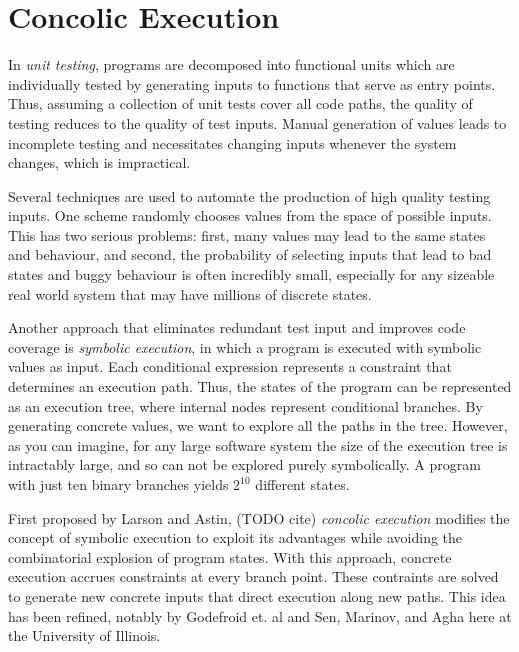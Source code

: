 \section{Concolic Execution}
In \textit{unit testing}, programs are decomposed into functional units which
are individually tested by generating inputs to functions that serve as entry
points. Thus, assuming a collection of unit tests cover all code paths, the
quality of testing reduces to the quality of test inputs. Manual generation of
values leads to incomplete testing and necessitates changing inputs whenever the
system changes, which is impractical. \par
Several techniques are used to automate
the production of high quality testing inputs. One scheme randomly chooses
values from the space of possible inputs. This has two serious problems: first,
many values may lead to the same states and behaviour, and second, the
probability of selecting inputs that lead to bad states and buggy behaviour is
often incredibly small, especially for any sizeable real world system that may
have millions of discrete states. \par
Another approach that eliminates redundant
test input and improves code coverage is \textit{symbolic execution}, in which a
program is executed with symbolic values as input. Each conditional expression
represents a constraint that determines an execution path. Thus, the states of
the program can be represented as an execution tree, where internal nodes
represent conditional branches. By generating concrete values, we want to
explore all the paths in the tree. However, as you can imagine, for any large
software system the size of the execution tree is intractably large, and so can
not be explored purely symbolically. A program with just ten binary branches
yields $2^{10}$ different states. \par
First proposed by Larson and Astin, (TODO
cite) \textit{concolic execution} modifies the concept of symbolic execution to
exploit its advantages while avoiding the combinatorial explosion of program
states. With this approach, concrete execution accrues constraints at every
branch point. These contraints are solved to generate new concrete inputs that
direct execution along new paths. This idea has been refined, notably by
Godefroid et. al and Sen, Marinov, and Agha here at the University of Illinois. 

